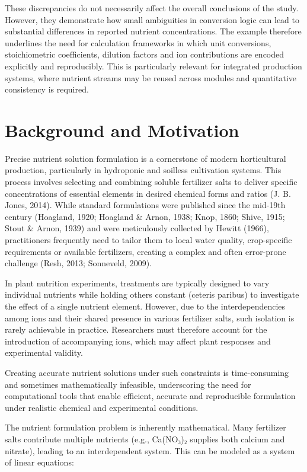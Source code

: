 \documentclass[
  letterpaper,
  DIV=11,
  numbers=noendperiod]{scrreprt}
\begin{document}
These discrepancies do not necessarily affect the overall conclusions of
the study. However, they demonstrate how small ambiguities in conversion
logic can lead to substantial differences in reported nutrient
concentrations. The example therefore underlines the need for
calculation frameworks in which unit conversions, stoichiometric
coefficients, dilution factors and ion contributions are encoded
explicitly and reproducibly. This is particularly relevant for
integrated production systems, where nutrient streams may be reused
across modules and quantitative consistency is required.

\section{Background and Motivation}\label{background-and-motivation}

Precise nutrient solution formulation is a cornerstone of modern
horticultural production, particularly in hydroponic and soilless
cultivation systems. This process involves selecting and combining
soluble fertilizer salts to deliver specific concentrations of essential
elements in desired chemical forms and ratios (J. B. Jones, 2014). While
standard formulations were published since the mid-19th century
(Hoagland, 1920; Hoagland \& Arnon, 1938; Knop, 1860; Shive, 1915; Stout
\& Arnon, 1939) and were meticulously collected by Hewitt (1966),
practitioners frequently need to tailor them to local water quality,
crop-specific requirements or available fertilizers, creating a complex
and often error-prone challenge (Resh, 2013; Sonneveld, 2009).

In plant nutrition experiments, treatments are typically designed to
vary individual nutrients while holding others constant (ceteris
paribus) to investigate the effect of a single nutrient element.
However, due to the interdependencies among ions and their shared
presence in various fertilizer salts, such isolation is rarely
achievable in practice. Researchers must therefore account for the
introduction of accompanying ions, which may affect plant responses and
experimental validity.

Creating accurate nutrient solutions under such constraints is
time-consuming and sometimes mathematically infeasible, underscoring the
need for computational tools that enable efficient, accurate and
reproducible formulation under realistic chemical and experimental
conditions.

The nutrient formulation problem is inherently mathematical. Many
fertilizer salts contribute multiple nutrients (e.g., Ca(NO₃)₂ supplies
both calcium and nitrate), leading to an interdependent system. This can
be modeled as a system of linear equations:
\end{document}
